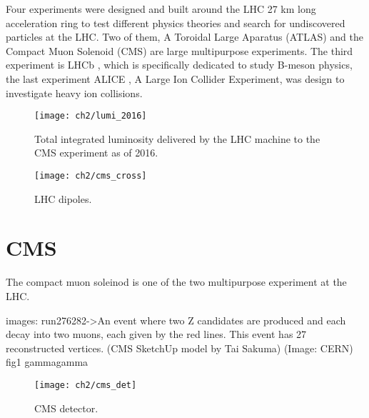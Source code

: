 Four experiments were designed and built around the LHC 27 km long acceleration ring to test different physics theories and search for undiscovered particles at the LHC. Two of them, A Toroidal Large Aparatus (ATLAS)\cite{atlas} and the Compact Muon Solenoid (CMS)\cite{cms_doc} are large multipurpose experiments. The third experiment is LHCb \cite{lhcb}, which is specifically dedicated to study B-meson physics, the last experiment ALICE \cite{alice}, A Large Ion Collider Experiment, was design to investigate heavy ion collisions.


\begin{figure}[!h]
	\centering
	\texttt{[image: ch2/lumi\_2016]}
	\caption[LHC luminosity]{Total integrated luminosity delivered by the LHC machine to the CMS experiment as of 2016.{}}
	\label{lumi2016}
\end{figure}


\begin{figure}[!h]
	\centering
	\texttt{[image: ch2/cms\_cross]}
	\caption[LHC dipoles]{LHC dipoles.}
	\label{fig:cmscross}
\end{figure}


\section{CMS}
The compact muon soleinod is one of the two multipurpose experiment at the LHC.

images: 
run276282->An event where two Z candidates are produced and each decay into two muons, each given by the red lines. This event has 27 reconstructed vertices. (CMS SketchUp model by Tai Sakuma) (Image: CERN)
fig1 gammagamma 



\begin{figure}[!h]
	\centering
	\texttt{[image: ch2/cms\_det]}
	\caption[CMS detector]{CMS detector.}
	\label{cms_det}
\end{figure}

